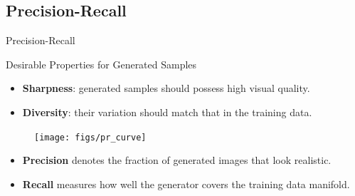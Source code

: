 \documentclass{beamer}
\begin{document}
\subsection{Precision-Recall}
\begin{frame}{Precision-Recall}
	\vspace{-0.5cm}
	\begin{block}{Desirable Properties for Generated Samples}
		\begin{itemize}
			\item \textbf{Sharpness}: generated samples should possess high visual quality.
			\item \textbf{Diversity}: their variation should match that in the training data.
		\end{itemize}
	\end{block}
	\eqpause
	\vspace{-0.5cm}
	\begin{figure}
		\texttt{[image: figs/pr\_curve]}
	\end{figure}
	\vspace{-0.3cm}
	\begin{itemize}
		\item \textbf{Precision} denotes the fraction of generated images that look realistic.
		\item \textbf{Recall} measures how well the generator covers the training data manifold.
	\end{itemize}
\end{frame}
\end{document}
